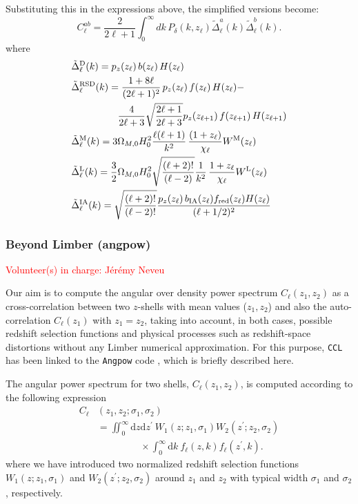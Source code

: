 \documentclass[\docopts]{\docclass}
\newcommand{\vol}[1]{\textcolor{red}{Volunteer(s) in charge: #1}}
\newcommand{\ccl}{{\tt CCL}\xspace}
\begin{document}
Substituting this in the expressions above, the simplified versions become:
\begin{equation}\label{eq:limber}
 C^{ab}_\ell=\frac{2}{2\ell+1}\int_0^\infty dk\,P_\delta\left(k,z_\ell\right)
 \tilde{\Delta}^a_\ell(k)\tilde{\Delta}^b_\ell(k).
\end{equation}
where
\begin{align}
 &\tilde{\Delta}_\ell^{\rm D}(k)=p_z(z_\ell)\,b(z_\ell)\,H(z_\ell)\\
 &\tilde{\Delta}_\ell^{\rm RSD}(k)=
 \frac{1+8\ell}{(2\ell+1)^2}\,p_z(z_\ell)\,f(z_\ell)\,H(z_\ell)-\\
 &\hspace{48pt}\frac{4}{2\ell+3}\sqrt{\frac{2\ell+1}{2\ell+3}}p_z(z_{\ell+1})\,f(z_{\ell+1})\,H(z_{\ell+1})\\
 &\tilde{\Delta}_\ell^{\rm M}(k)=3\Omega_{M,0}H_0^2\frac{\ell(\ell+1)}{k^2}\,
 \frac{(1+z_\ell)}{\chi_\ell}W^{\rm M}(z_\ell)\\
 &\tilde{\Delta}_\ell^{\rm L}(k)=\frac{3}{2}\Omega_{M,0}H_0^2\sqrt{\frac{(\ell+2)!}{(\ell-2)}}\frac{1}{k^2}\,
 \frac{1+z_\ell}{\chi_\ell}W^{\rm L}(z_\ell)\\
 &\tilde{\Delta}_\ell^{\rm IA}(k)=\sqrt{\frac{(\ell+2)!}{(\ell-2)!}}\frac{p_z(z_\ell)\,b_{\rm IA}(z_\ell)f_{\rm red}(z_\ell)H(z_\ell)}{(\ell+1/2)^2}
\end{align}


\subsubsection{Beyond Limber (angpow)}
\vol{J\'er\'emy Neveu}

Our aim is to compute the angular over density power spectrum  $C_{\ell}(z_1, z_2)$ as a cross-correlation between two $z$-shells with mean values ($z_1, z_2$) and also the auto-correlation $C_{\ell}(z_1)$ with $z_1 = z_2$,  taking into account, in both cases, possible redshift selection functions and physical processes such as redshift-space distortions without any Limber numerical approximation. For this purpose, \ccl has been linked to the \texttt{Angpow} code \citep{2017arXiv170103592C}, which is briefly described here.

The angular power spectrum for two shells, $C_{\ell}(z_1, z_2)$, is computed according to the following expression
\begin{equation}
\begin{split}
C_{\ell}&(z_1, z_2;\sigma_1, \sigma_2)\\& = \iint_0^\infty \mathrm{d} z \mathrm{d} z^\prime \ W_1(z; z_1, \sigma_1) W_2(z^\prime; z_2, \sigma_2)\\
&\phantom{\iint_0^\infty \mathrm{d} z \mathrm{d} z^\prime} \times \int_0^\infty \mathrm{d} k\ f_{\ell}(z, k) f_{\ell}(z^\prime, k).
\end{split}
\label{eq-clz1z2-obs}
\end{equation}
%
where we have introduced two normalized redshift selection functions $W_1(z;z_1,\sigma_1)$ and $W_2(z^\prime;z_2,\sigma_2)$  around $z_1$ and $z_2$ with typical width $\sigma_1$ and $\sigma_2$, respectively.
\end{document}
